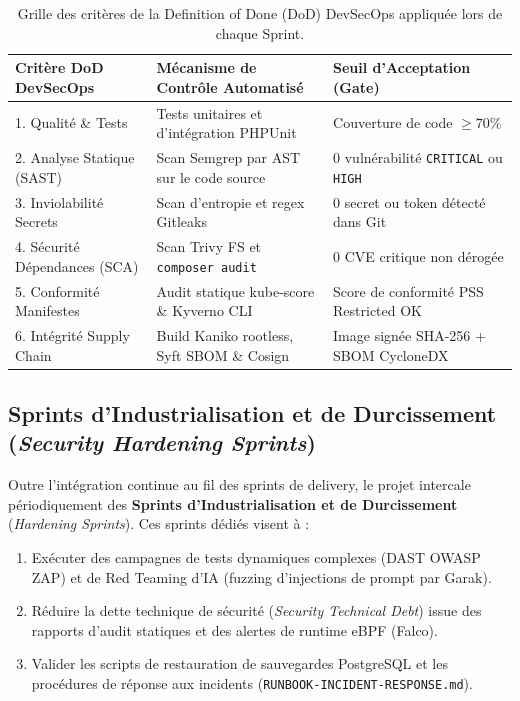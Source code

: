 \begin{table}[htbp]
\centering
\scriptsize
\begin{tabular}{@{}p{3.2cm}p{5.4cm}p{4.2cm}@{}}
\toprule
\textbf{Critère DoD DevSecOps} & \textbf{Mécanisme de Contrôle Automatisé} & \textbf{Seuil d'Acceptation (Gate)} \\
\midrule
1. Qualité \& Tests & Tests unitaires et d'intégration PHPUnit & Couverture de code $\ge 70\%$ \\
2. Analyse Statique (SAST) & Scan Semgrep par AST sur le code source & 0 vulnérabilité \texttt{CRITICAL} ou \texttt{HIGH} \\
3. Inviolabilité Secrets & Scan d'entropie et regex Gitleaks & 0 secret ou token détecté dans Git \\
4. Sécurité Dépendances (SCA) & Scan Trivy FS et \texttt{composer audit} & 0 CVE critique non dérogée \\
5. Conformité Manifestes & Audit statique kube-score \& Kyverno CLI & Score de conformité PSS Restricted OK \\
6. Intégrité Supply Chain & Build Kaniko rootless, Syft SBOM \& Cosign & Image signée SHA-256 + SBOM CycloneDX \\
\bottomrule
\end{tabular}
\caption{Grille des critères de la Definition of Done (DoD) DevSecOps appliquée lors de chaque Sprint.}
\label{tab:dod_devsecops}
\end{table}

\subsection{Sprints d'Industrialisation et de Durcissement (\textit{Security Hardening Sprints})}

Outre l'intégration continue au fil des sprints de delivery, le projet intercale périodiquement des \textbf{Sprints d'Industrialisation et de Durcissement} (\textit{Hardening Sprints}). Ces sprints dédiés visent à :
\begin{enumerate}
    \item Exécuter des campagnes de tests dynamiques complexes (DAST OWASP ZAP) et de Red Teaming d'IA (fuzzing d'injections de prompt par Garak).
    \item Réduire la dette technique de sécurité (\textit{Security Technical Debt}) issue des rapports d'audit statiques et des alertes de runtime eBPF (Falco).
    \item Valider les scripts de restauration de sauvegardes PostgreSQL et les procédures de réponse aux incidents (\texttt{RUNBOOK-INCIDENT-RESPONSE.md}).
\end{enumerate}

